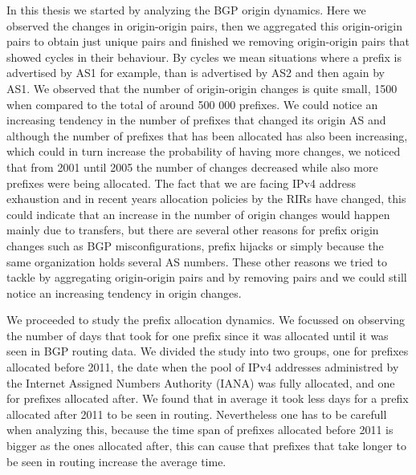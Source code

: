 \documentclass[11pt,a4paper]{scrreprt}
\begin{document}
In this thesis we started by analyzing the BGP origin dynamics. Here we observed the changes in origin-origin pairs, then we aggregated this origin-origin pairs to obtain just unique pairs and finished we removing origin-origin pairs that showed cycles in their behaviour. By cycles we mean situations where a prefix is advertised by AS1 for example, than is advertised by AS2 and then again by AS1. We observed that the number of origin-origin changes is quite small, 1500 when compared to the total of around 500 000 prefixes. We could notice an increasing tendency in the number of prefixes that changed its origin AS and although the number of prefixes that has been allocated has also been increasing, which could in turn increase the probability of having more changes, we noticed that from 2001 until 2005 the number of changes decreased while also more prefixes were being allocated. The fact that we are facing IPv4 address exhaustion and in recent years allocation policies by the RIRs have changed, this could indicate that an increase in the number of origin changes would happen mainly due to transfers, but there are several other reasons for prefix origin changes such as BGP misconfigurations, prefix hijacks or simply because the same organization holds several AS numbers. These other reasons we tried to tackle by aggregating origin-origin pairs and by removing pairs and we could still notice an increasing tendency in origin changes.

We proceeded to study the prefix allocation dynamics. We focussed on observing the number of days that took for one prefix since it was allocated until it was seen in BGP routing data. We divided the study into two groups, one for prefixes allocated before 2011, the date when the pool of IPv4 addresses administred by the Internet Assigned Numbers Authority (IANA) was fully allocated, and one for prefixes allocated after. We found that in average it took less days for a prefix allocated after 2011 to be seen in routing. Nevertheless one has to be carefull when analyzing this, because the time span of prefixes allocated before 2011 is bigger as the ones allocated after, this can cause that prefixes that take longer to be seen in routing increase the average time.
\end{document}
